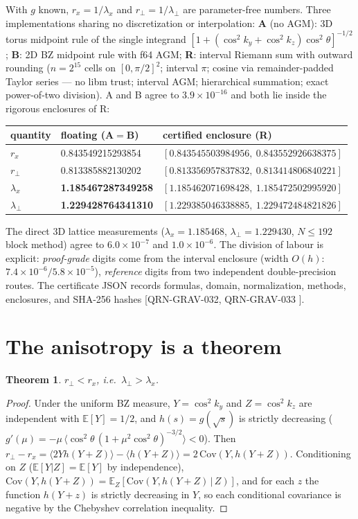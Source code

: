 \documentclass[aps,prb,preprint,nofootinbib]{revtex4-2}
\newtheorem{theorem}{Theorem}
\begin{document}
With $g$ known, $r_x = 1/\lambda_x$ and $r_\perp = 1/\lambda_\perp$ are
parameter-free numbers. Three implementations sharing no discretization or
interpolation: \textbf{A} (no AGM): 3D torus midpoint rule of the single
integrand $[1+(\cos^2 k_y + \cos^2 k_z)\cos^2\theta]^{-1/2}$; \textbf{B}: 2D BZ
midpoint rule with f64 AGM; \textbf{R}: interval Riemann sum with outward
rounding ($n = 2^{15}$ cells on $[0,\pi/2]^2$; interval $\pi$; cosine via
remainder-padded Taylor series --- no libm trust; interval AGM; hierarchical
summation; exact power-of-two division). A and B agree to
$3.9\times10^{-16}$ and both lie inside the rigorous enclosures of R:

\begin{center}
\begin{tabular}{lll}
\toprule
quantity & floating (A${}={}$B) & certified enclosure (R)\\
\midrule
$r_x$ & 0.843549215293854 & $[0.843545503984956,\ 0.843552926638375]$\\
$r_\perp$ & 0.813385882130202 & $[0.813356957837832,\ 0.813414806840221]$\\
$\lambda_x$ & \textbf{1.185467287349258} & $[1.185462071698428,\ 1.185472502995920]$\\
$\lambda_\perp$ & \textbf{1.229428764341310} & $[1.229385046338885,\ 1.229472484821826]$\\
\bottomrule
\end{tabular}
\end{center}

The direct 3D lattice measurements ($\lambda_x = 1.185468$,
$\lambda_\perp = 1.229430$, $N \le 192$ block method) agree to
$6.0\times10^{-7}$ and $1.0\times10^{-6}$. The division of labour is explicit:
\emph{proof-grade} digits come from the interval enclosure (width $O(h)$:
$7.4\times10^{-6} / 5.8\times10^{-5}$), \emph{reference} digits from two
independent double-precision routes. The certificate JSON records formulas,
domain, normalization, methods, enclosures, and SHA-256 hashes
[QRN-GRAV-032, QRN-GRAV-033 \cite{Repo}].

\section{The anisotropy is a theorem}

\begin{theorem}
$r_\perp < r_x$, i.e.\ $\lambda_\perp > \lambda_x$.
\end{theorem}

\begin{proof}
Under the uniform BZ measure, $Y = \cos^2 k_y$ and $Z = \cos^2 k_z$ are
independent with $\mathbb{E}[Y] = 1/2$, and $h(s) = g(\sqrt s)$ is strictly
decreasing ($g'(\mu) = -\mu\,\langle \cos^2\theta\,(1+\mu^2\cos^2\theta)^{-3/2}
\rangle < 0$). Then
$r_\perp - r_x = \langle 2Y h(Y{+}Z)\rangle - \langle h(Y{+}Z)\rangle
= 2\,\mathrm{Cov}(Y, h(Y{+}Z))$. Conditioning on $Z$
($\mathbb{E}[Y|Z] = \mathbb{E}[Y]$ by independence),
$\mathrm{Cov}(Y, h(Y{+}Z)) = \mathbb{E}_Z[\mathrm{Cov}(Y, h(Y{+}Z)\,|\,Z)]$,
and for each $z$ the function $h(Y{+}z)$ is strictly decreasing in $Y$, so each
conditional covariance is negative by the Chebyshev correlation inequality.
\end{proof}
\end{document}
